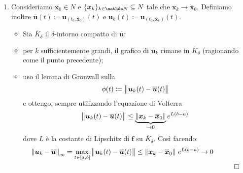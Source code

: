 {\begin{enumerate}
        Dunque, per il lemma di Gronwall, $ \displaystyle \phi(t)\le A_{ \varepsilon}\, e^{L(t-a)}  $. Inoltre, avendo $ \phi(t_{ \varepsilon} ) = \delta $, si ha che \[
            0< \delta \le\underbrace{A_{ \varepsilon}}_{\to 0 } \, \underbrace{e^{L(t_{ \varepsilon} -a)}}_{>0} \xrightarrow[]{\bm{x}_{\varepsilon}\to \bm{x}_0} 0 
        \]che è assurdo.
        \item Consideriamo $ \overline{\bm{x}}_0 \in N $ e $ \{\bm{x}_{k} \}_{k \in \N} \subseteq N$ tale che $ \bm{x}_k\longrightarrow \overline{\bm{x}}_0 $. Definiamo inoltre $ \overline{\bm{u}}(t)\coloneqq \bm{u}_{(t_0,\overline{\bm{x}}_0)}(t) $ e 
         $ \bm{u}_k (t)\coloneqq \bm{u}_{(t_0,\bm{x}_k)}(t)$.
         \begin{itemize}
            \item Sia $ \overline{K}_{\delta} $ il $ \delta $-intorno compatto di $ \overline{\bm{u}} $;
            \item per $ k $ sufficientemente grandi, il grafico di $ \bm{u}_k $ rimane in $ \overline{K}_{\delta} $ (ragionando come il punto precedente);
            \item uso il lemma di Gronwall sulla \[
                \phi(t)\coloneqq\left\lVert\bm{u}_k(t)-\overline{\bm{u}}(t)\right\rVert
            \]e ottengo, sempre utilizzando l'equazione di Volterra \[
                \left\lVert\bm{u}_k(t)-\overline{\bm{u}}(t)\right\rVert \le \underset{\to 0}{\underbrace{\left\lVert\bm{x}_k-\overline{\bm{x}}_0\right\rVert}}\,e^{L(b-a)}
            \]dove $ L $ è la costante di Lipschitz di $ \bm{f} $ su $ \overline{K}_{\delta}$. Così facendo: 
            \begin{align*}
                \displaystyle \left\lVert\bm{u}_k-\overline{\bm{u}}\right\rVert_{\infty} = \max_{t \in [a,b]} \left\lVert\bm{u}_k(t)-\overline{\bm{u}}(t)\right\rVert\le \left\lVert\bm{x}_k-\overline{\bm{x}}_0\right\rVert\,e^{L(b-a)}\to 0  \\
                &&\qed
            \end{align*}
        \end{itemize}
    \end{enumerate}
}